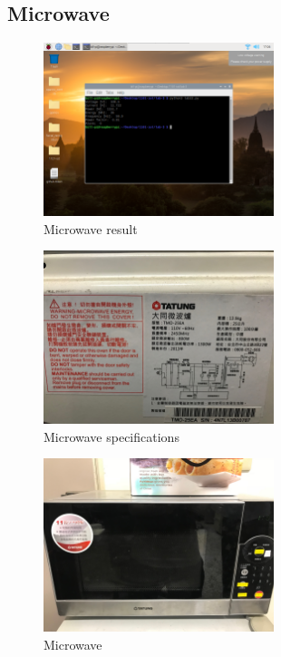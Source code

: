 \documentclass[12pt, a4paper, onside]{article}
\begin{document}
\subsection{Microwave}
\begin{figure}[h]
  \centering
  \includegraphics[width=0.6\textwidth]{img/6_res_microwave}
  \caption{Microwave result}
\end{figure}
\begin{figure}[h]
  \centering
  \includegraphics[width=0.6\textwidth]{img/6_spe_microwave}
  \caption{Microwave specifications}
\end{figure}
\begin{figure}[h]
  \centering
  \includegraphics[width=0.6\textwidth]{img/6_pic_microwave}
  \caption{Microwave}
\end{figure}
\end{document}
